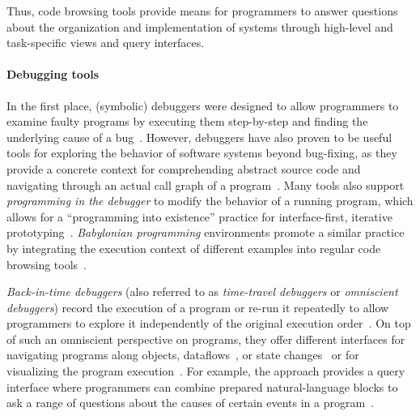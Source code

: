 	Thus, code browsing tools provide means for programmers to answer questions about the organization and implementation of systems through high-level and task-specific views and query interfaces.

	\paragraph{Debugging tools}
	\label{par:background/expsys/tools/debugging}
	In the first place, (symbolic) debuggers were designed to allow programmers to examine faulty programs by executing them step-by-step and finding the underlying cause of a bug~\cites[sec.~17.4]{goldberg1983smalltalk}[sec.~18f.]{goldberg1984smalltalk}.
	However, debuggers have also proven to be useful tools for exploring the behavior of software systems beyond bug-fixing, as they provide a concrete context for comprehending abstract source code and navigating through an actual call graph of a program~\cite[sec.~6.4]{thiede2023squeak}.
	Many tools also support \emph{programming in the debugger} to modify the behavior of a running program, which allows for a ``programming into existence'' practice for interface-first, iterative prototyping~\cite{rosson1993active}.
	\emph{Babylonian programming} environments promote a similar practice by integrating the execution context of different examples into regular code browsing tools~\cite{rauch2019babylonian}.

	\emph{Back-in-time debuggers} (also referred to as \emph{time-travel debuggers} or \emph{omniscient debuggers}) record the execution of a program or re-run it repeatedly to allow programmers to explore it independently of the original execution order~\cite{lewis2003debugging,pothier2009back,perscheid2014follow}.
	On top of such an omniscient perspective on programs, they offer different interfaces for navigating programs along objects, dataflows~\cite{lienhard2009taking}, or state changes~\cite{thiede2023object,thiede2023time} or for visualizing the program execution~\cite{cornelissen2008execution,thiede2024bringing}.
	For example, the  approach provides a query interface where programmers can combine prepared natural-language blocks to ask a range of questions about the causes of certain events in a program~\cite{ko2004designing}.

